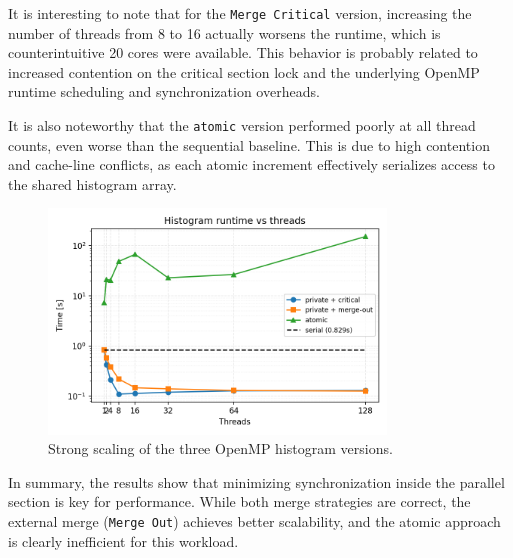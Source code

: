 It is interesting to note that for the \texttt{Merge Critical} version, increasing the number of threads from 8 to 16 actually worsens the runtime, which is counterintuitive 20 cores were available. This behavior is probably related to increased contention on the critical section lock and the underlying OpenMP runtime scheduling and synchronization overheads.

It is also noteworthy that the \texttt{atomic} version performed poorly at all thread counts, even worse than the sequential baseline.  
This is due to high contention and cache-line conflicts, as each atomic increment effectively serializes access to the shared histogram array.

\begin{figure}[H]
    \centering
    \includegraphics[width=0.8\textwidth]{../Skeleton_codes/hist/plots/hist_runtime_scaling.png}
    \caption{Strong scaling of the three OpenMP histogram versions.}
    \label{fig:histScaling}
\end{figure}

\noindent
In summary, the results show that minimizing synchronization inside the parallel section is key for performance.
While both merge strategies are correct, the external merge (\texttt{Merge Out}) achieves better scalability,
and the atomic approach is clearly inefficient for this workload.
